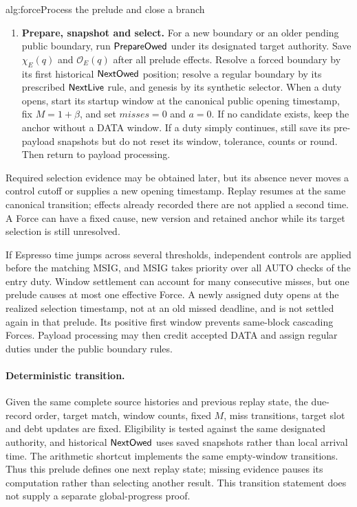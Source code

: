 \begin{protocol}{alg:force}{Process the prelude and close a branch}
\begin{enumerate}[label=\textbf{\arabic*)},itemsep=3pt]
\item \textbf{Prepare, snapshot and select.} For a new boundary or
an older pending public boundary, run $\mathsf{PrepareOwed}$ under its
designated target authority. Save $\chi_E(q)$ and
$\mathcal O_E(q)$ after all prelude effects. Resolve a forced boundary
by its first historical $\mathsf{NextOwed}$ position; resolve a regular
boundary by its prescribed $\mathsf{NextLive}$ rule, and genesis by its
synthetic selector. When a duty opens,
start its startup window at the canonical public opening timestamp,
fix $M=1+\beta$, and set $\mathit{misses}=0$ and $a=0$. If no candidate
exists, keep the anchor without a DATA window. If a duty simply
continues, still save its pre-payload snapshots but do not reset its
window, tolerance, counts or round. Then return to payload processing.
\end{enumerate}
\end{protocol}

Required selection evidence may be obtained later, but its absence
never moves a control cutoff or supplies a new opening timestamp.
Replay resumes at the same canonical transition; effects already
recorded there are not applied a second time. A Force can have a fixed
cause, new version and retained anchor while its target selection is
still unresolved.

If Espresso time jumps across several thresholds, independent
controls are applied before the matching MSIG, and MSIG takes priority
over all AUTO checks of the entry duty. Window settlement can account
for many consecutive misses, but one prelude causes at most one
effective Force. A newly assigned duty opens at the realized selection
timestamp, not at an old missed deadline, and is not settled again in
that prelude. Its positive first window prevents same-block cascading
Forces. Payload processing may then credit accepted DATA and assign
regular duties under the public boundary rules.

\paragraph{Deterministic transition.}
Given the same complete source histories and previous replay state,
the due-record order, target match, window counts, fixed $M$, miss
transitions, target slot and debt updates are fixed. Eligibility is
tested against the same designated authority, and historical
$\mathsf{NextOwed}$ uses saved snapshots rather than local arrival time.
The arithmetic shortcut implements the same empty-window transitions.
Thus this prelude defines one next replay state; missing evidence
pauses its computation rather than selecting another result. This
transition statement does not supply a separate global-progress proof.

